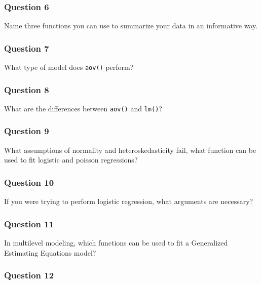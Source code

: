 \documentclass[]{tufte-book}
\theoremstyle{definition}
\theoremstyle{definition}
\theoremstyle{remark}
\begin{document}
\subsubsection*{Question 6}\label{question-6}

Name three functions you can use to summarize your data in an
informative way.

\subsubsection*{Question 7}\label{question-7}

What type of model does \texttt{aov()} perform?

\subsubsection*{Question 8}\label{question-8}

What are the differences between \texttt{aov()} and \texttt{lm()}?

\subsubsection*{Question 9}\label{question-9}

What assumptions of normality and heteroskedasticity fail, what function
can be used to fit logistic and poisson regressions?

\subsubsection*{Question 10}\label{question-10}

If you were trying to perform logistic regression, what arguments are
necessary?

\subsubsection*{Question 11}\label{question-11}

In multilevel modeling, which functions can be used to fit a Generalized
Estimating Equations model?

\subsubsection*{Question 12}\label{question-12}
\end{document}
